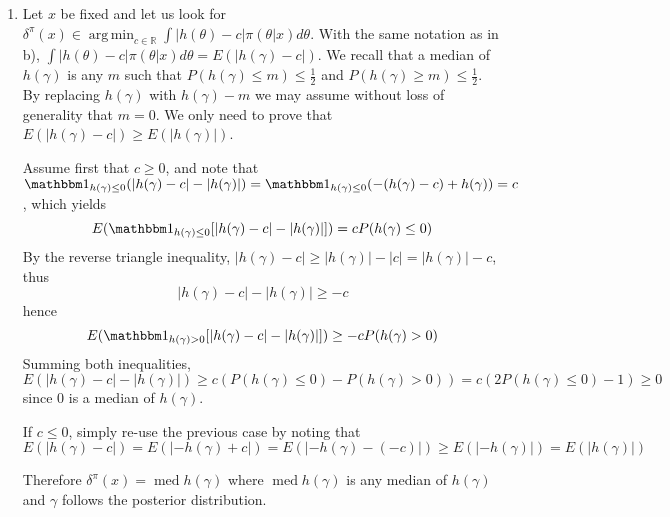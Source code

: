 \documentclass[a4paper,11pt]{article}
\DeclareMathOperator*{\argmin}{arg\,min}
\begin{document}
\begin{enumerate}[label=(\alph*)]
  \item Let $x$ be fixed and let us look for $\displaystyle \delta^{\pi}(x)\in \argmin_{c\in \mathbb R} \int |h(\theta)-c|\pi(\theta|x)d\theta$. With the same notation as in b), $\displaystyle \int |h(\theta)-c|\pi(\theta|x)d\theta = E(|h(\gamma)-c|)$. We recall that a median of $h(\gamma)$ is any $m$ such that $P(h(\gamma)\leq m)\leq \frac 12$ and $P(h(\gamma)\geq m)\leq \frac 12$. By replacing $h(\gamma)$ with $h(\gamma)-m$ we may assume without loss of generality that $m=0$. We only need to prove that $E(|h(\gamma)-c|) \geq E(|h(\gamma)|)$. 

  Assume first that $c\geq 0$, and note that $\mathbbm 1_{h(\gamma)\leq 0}(|h(\gamma)-c|-|h(\gamma)|) = \mathbbm 1_{h(\gamma)\leq 0} (-(h(\gamma)-c)+h(\gamma)) = c$, which yields $$E(\mathbbm 1_{h(\gamma)\leq 0} [|h(\gamma)-c|-|h(\gamma)|]) = cP(h(\gamma)\leq 0)$$
  By the reverse triangle inequality, $|h(\gamma)-c|\geq |h(\gamma)|-|c| = |h(\gamma)|-c$, thus $$|h(\gamma)-c| - |h(\gamma)| \geq -c$$
  hence $$E(\mathbbm 1_{h(\gamma)>0} [|h(\gamma)-c|-|h(\gamma)|]) \geq -cP(h(\gamma)> 0)$$
  Summing both inequalities, $$E(|h(\gamma)-c|-|h(\gamma)|)\geq c(P(h(\gamma)\leq 0)-P(h(\gamma)> 0)) = c(2P(h(\gamma)\leq 0)-1)\geq 0$$ since $0$ is a median of $h(\gamma)$.

  If $c\leq 0$, simply re-use the previous case by noting that $$E(|h(\gamma)-c|) = E(|-h(\gamma)+c|)=E(|-h(\gamma)-(-c)|)\geq E(|-h(\gamma)|) = E(|h(\gamma)|)$$

  Therefore $\delta^{\pi}(x) = \operatorname{med} h(\gamma)$ where $\operatorname{med} h(\gamma)$ is any median of $h(\gamma)$ and $\gamma$ follows the posterior distribution.
\end{enumerate}
\end{document}
